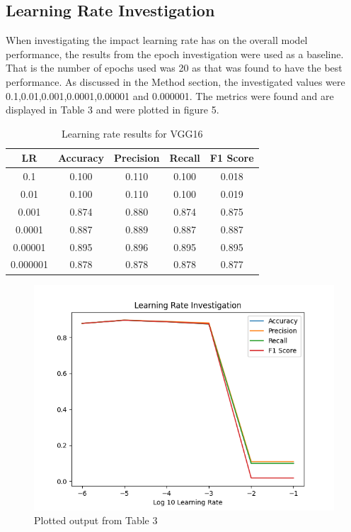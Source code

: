 \documentclass[10pt,twocolumn,letterpaper]{article}
\begin{document}
\subsection{Learning Rate Investigation}
When investigating the impact learning rate has on the overall model performance, the results 
from the epoch investigation were used as a baseline. That is the number of epochs used was
20 as that was found to have the best performance. As discussed in the Method section, 
the investigated values were 0.1,0.01,0.001,0.0001,0.00001 and 0.000001. The metrics were found 
and are displayed in Table 3 and were plotted in figure 5.
\begin{table}[H]
   \begin{center}
      \label{vgg16lrinvestigation}
      \begin{tabular}{||c c c c c||} 
       \hline
       LR & Accuracy & Precision & Recall& F1 Score \\  
       \hline\hline
       0.1 & 0.100  & 0.110 & 0.100 &0.018 \\ 
       \hline
       0.01 & 0.100  &  0.110& 0.100 &0.019\\
       \hline
       0.001 & 0.874  &0.880 & 0.874 & 0.875\\
       \hline
       0.0001 & 0.887 & 0.889 & 0.887 & 0.887 \\
       \hline
       0.00001 & 0.895 & 0.896 & 0.895 & 0.895 \\
       \hline
       0.000001 & 0.878 & 0.878 & 0.878 & 0.877 \\
       \hline
       \hline
      \end{tabular}
      \caption{Learning rate results for VGG16}
   \end{center}
   \end{table}
   \begin{center}
      \begin{figure}[H]
      \includegraphics[scale=0.6]{lr_investigation.png}
      \caption{Plotted output from Table 3}
\end{figure}
\end{center}
\end{document}
